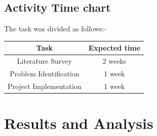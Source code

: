 \documentclass[10pt]{article}
\begin{document}
	\subsection{Activity Time chart}
		The task was divided as follows:-
		\begin{center}
			\begin{tabular} {|| c | c || }				
				\hline 
				\textbf{Task} & \textbf{Expected time} \\
				\hline
				Literature Survey & 2 weeks \\
				\hline 
				Problem Identification & 1 week \\
				\hline 
				Project Implementation & 1 week \\
				\hline 
				
			\end{tabular}
		\end{center}	
	\newpage
	\section{Results and Analysis}
		\hrulefill
\end{document}
